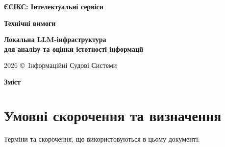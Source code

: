 \documentclass{article}
\newcommand\HUGE[1]{\fontsize{38}{38}\selectfont #1}
\begin{document}
\pagestyle{fancy}

\begin{titlepage}
\AddToShipoutPictureBG*{\AtPageLowerLeft{\color{primary}\rule{\paperwidth}{\paperheight}}}
\color{white}\thispagestyle{empty}\vspace*{4cm}\centering
  {\Huge \textbf{ЄСІКС: Інтелектуальні сервіси} \par} \vspace{2cm}
  {\HUGE \textbf{Технічні вимоги} \par} \vspace{2.5cm}
  {\LARGE \textbf{Локальна LLM-інфраструктура \\ для аналізу та оцінки істотності інформації} \par} \vspace{2.5cm}
\vfill
  {\large 2026 \copyright\ Інформаційні Судові Системи \par}
\end{titlepage}

\newpage
\begin{center}
  {\Huge\color{primary}\bfseries Зміст\par}
\end{center}
\vspace{40pt}
\tableofcontents

\newpage
\begin{abstract}
У цьому документі наведено детальні технічні вимоги до підсистеми ERP/1: Істотність, яка розробляється
як сучасний інтелектуальний сервіс локального аналізу, семантичного пошуку та оцінки інформації на базі
штучного інтелекту (ШІ). Платформа передбачає використання децентралізованих обчислювальних вузлів з
споживчими графічними прискорювачами (GPU) для локального виконання квантованих великих мовних
моделей (LLM) та семантичного RAG-пошуку. Вимоги визначають архітектуру апаратного забезпечення,
програмний стек, вимоги безпеки (КСЗІ, LUKS, апаратний модуль безпеки, Cilium), комплаєнс із стандартами
NIST SP 800-53 та NIST AI 600-1, а також метрики оцінки якості та відмовостійкості системи в периферійному контурі.
\end{abstract}

\newpage
\section{Умовні скорочення та визначення}

Терміни та скорочення, що використовуються в цьому документі:
\end{document}
